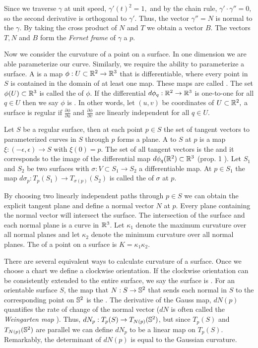 Since we traverse $\gamma$
at unit speed, $\gamma'(t)^2=1,$ and by the chain rule, $\gamma'\cdot \gamma''=0,$
so  the second derivative is orthogonal to $\gamma'$. Thus, the
vector $\gamma''=N$ is normal to the $\gamma$. 
By taking the cross product of $N$ and $T$ we obtain a vector $B$.
The vectors $T,N$ and $B$ form the \emph{Fernet frame} of $\gamma$ a $p.$

Now we consider the curvature of a point on a surface. In one dimension we are
able parameterize our curve. Similarly, we require the ability to parameterize a surface.
A  is a map $\phi:U\subset \mathbb{R}^2 \to \mathbb{R}^3$ that
is differentiable, where every point in $S$ is contained in the domain of at least one map.
These maps are called .
 The set $\phi(U)\subset \mathbb{R}^3$ is called the  of $\phi$.
If the differential $d\phi_q:\mathbb{R}^2\to \mathbb{R}^3$ is one-to-one for all $q\in U$ then
we say $\phi$ is . In other words, let $(u,v)$ be coordinates of $U\subset \mathbb{R}^2,$
a surface is regular if $\frac{\partial\phi}{\partial u}$
and $\frac{\partial\phi}{\partial v}$ are linearly independent for all $q\in U$.

Let $S$ be a regular surface, then at each point $p\in S$ the set of tangent vectors
to parameterized curves in $S$ through $p$ forms a plane.
A  to $S$ at $p$ is a map $\xi:(-\epsilon,\epsilon)\to S$ with $\xi(0)=p$.
The set of all tangent vectors is the  and it corresponds to the image
of the differential map $d\phi_q(\mathbb{R}^2)\subset \mathbb{R}^3$ (prop. 1 \cite{doc76}).
Let $S_1$ and $S_2$ be two surfaces with $\sigma:V\subset S_1\to S_2$ a differentiable map.
At $p\in S_1$ the map $d\sigma_p:T_p(S_1)\to T_{\sigma(p)}(S_2)$ is called the
 of $\sigma$ at $p$.

By choosing two linearly independent paths through $p\in S$ we can obtain the explicit tangent
plane and define a normal vector $N$ at $p$.
Every plane containing the normal vector will intersect the surface.
The intersection of the surface and each normal plane is a curve in $\mathbb{R}^3$. 
Let $\kappa_1$ denote the maximum curvature over all normal planes
and let $\kappa_2$ denote the minimum curvature over all normal planes.
The  of a point on a surface is
$K=\kappa_1\kappa_2.$

There are several equivalent ways to calculate curvature of a surface.
Once we choose a chart we define a clockwise orientation. If the clockwise
orientation can be consistently extended to the entire surface, we say
the surface is .
For an orientable surface $S$, the map that  $N:S\to \mathbb{S}^2$ that sends each
normal in $S$ to the corresponding point on $\mathbb{S}^2$ is
the .
The derivative of the Gauss map, $dN(p)$ quantifies the rate of change of
the normal vector ($dN$ is often called the \emph{Weingarten map} \cite{Crane:2013}).
Thus, $dN_p:T_p(S)\to T_{N(p)}(\mathbb{S}^2)$, but since $T_p(S)$ and $T_{N(p)}(\mathbb{S}^2)$
are parallel we can define $dN_p$ to be a linear map on $T_p(S)$.
Remarkably, the determinant of $dN(p)$ is equal to the Gaussian curvature.

